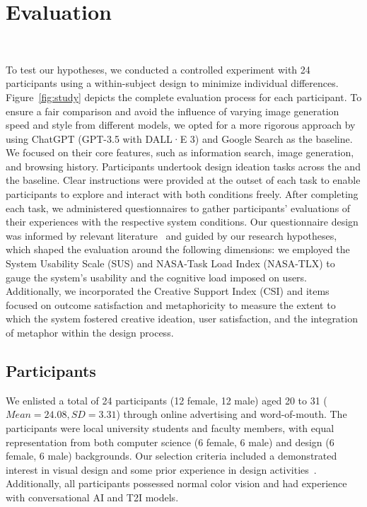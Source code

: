 \section{Evaluation}~\label{sec:eval}



To test our hypotheses, we conducted a controlled experiment with 24 participants using a within-subject design to minimize individual differences. 
Figure~\ref{fig:study} depicts the complete evaluation process for each participant.
To ensure a fair comparison and avoid the influence of varying image generation speed and style from different models, we opted for a more rigorous approach by using ChatGPT (GPT-3.5 with DALL·E 3) and Google Search as the baseline. 
We focused on their core features, such as information search, image generation, and browsing history.
Participants undertook design ideation tasks across the \sysname{} and the baseline. 
Clear instructions were provided at the outset of each task to enable participants to explore and interact with both conditions freely.
After completing each task, we administered questionnaires to gather participants' evaluations of their experiences with the respective system conditions. 
Our questionnaire design was informed by relevant literature~\cite{HART1988139, 10.1145/2617588, brooke1996sus} and guided by our research hypotheses, which shaped the evaluation around the following dimensions: we employed the System Usability Scale (SUS) and NASA-Task Load Index (NASA-TLX) to gauge the system's usability and the cognitive load imposed on users. Additionally, we incorporated the Creative Support Index (CSI) and items focused on outcome satisfaction and metaphoricity to measure the extent to which the system fostered creative ideation, user satisfaction, and the integration of metaphor within the design process.



\subsection{Participants}


We enlisted a total of 24 participants (12 female, 12 male) aged 20 to 31 ($Mean = 24.08, SD = 3.31$) through online advertising and word-of-mouth. The participants were local university students and faculty members, with equal representation from both computer science (6 female, 6 male) and design (6 female, 6 male) backgrounds. Our selection criteria included a demonstrated interest in visual design and some prior experience in design activities~\cite{10.1145/3411764.3445325}. Additionally, all participants possessed normal color vision and had experience with conversational AI and T2I models.




